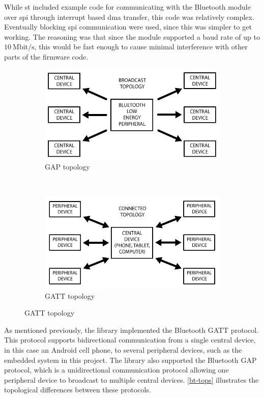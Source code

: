 While \gls{st} included example code for communicating with the Bluetooth module over \gls{spi} through interrupt based \gls{dma} transfer, this code was relatively complex. Eventually blocking \gls{spi} communication were used, since this was simpler to get working. The reasoning was that since the module supported a baud rate of up to $10~\textrm{Mbit/s}$, this would be fast enough to cause minimal interference with other parts of the firmware code.
\begin{figure}[H]
	\centering
	\begin{subfigure}[t]{0.47\textwidth}
	\includegraphics[width=\textwidth]{Figures/bt_gap.png}
	\caption{GAP topology}
	\label{bt-gap}
	\end{subfigure}
	~
	\begin{subfigure}[t]{0.47\textwidth}
	\includegraphics[width=\textwidth]{Figures/bt_gatt.png}
	\caption{ GATT topology}
	\label{bt-gatt}
	\end{subfigure}
	\label{bt-tops}
\end{figure}

As mentioned previously, the library implemented the Bluetooth GATT protocol. This protocol supports bidirectional communication from a single central device, in this case an Android cell phone, to several peripheral devices, such as the embedded system in this project. The library also supported the Bluetooth GAP protocol, which is a unidirectional communication protocol allowing one peripheral device to broadcast to multiple central devices. \autoref{bt-tops} illustrates the topological differences between these protocols.

